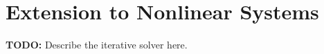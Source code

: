 \documentclass[11pt]{article}
\newcommand{\T}{\intercal}
\newcommand\dd[2]{\frac{\partial#1}{\partial#2}}
\begin{document}






\section{Extension to Nonlinear Systems}
\textbf{TODO:} Describe the iterative solver here.

\newpage
\end{document}

